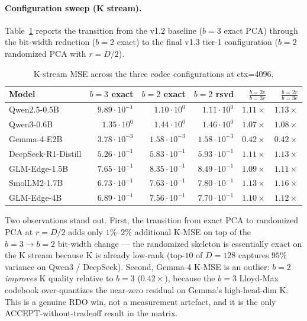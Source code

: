 \documentclass[11pt,a4paper]{article}
\theoremstyle{definition}
\theoremstyle{plain}
\begin{document}
\paragraph{Configuration sweep (K stream).}
Table~\ref{tab:mse-k-sweep} reports the transition from the v1.2 baseline ($b=3$ exact PCA) through the bit-width reduction ($b=2$ exact) to the final v1.3 tier-1 configuration ($b=2$ randomized PCA with $r=D/2$).

\begin{table}[H]
\centering
\small
\caption{K-stream MSE across the three codec configurations at ctx=4096.}
\label{tab:mse-k-sweep}
\begin{tabular}{lrrrrr}
  \toprule
  Model & $b=3$ exact & $b=2$ exact & $b=2$ rsvd & $\frac{b=2e}{b=3e}$ & $\frac{b=2r}{b=3e}$ \\
  \midrule
  Qwen2.5-0.5B                  & $9.89\!\cdot\!10^{-1}$ & $1.10\!\cdot\!10^{0}$  & $1.11\!\cdot\!10^{0}$  & $1.11\times$ & $1.13\times$ \\
  Qwen3-0.6B                    & $1.35\!\cdot\!10^{0}$  & $1.44\!\cdot\!10^{0}$  & $1.46\!\cdot\!10^{0}$  & $1.07\times$ & $1.08\times$ \\
  Gemma-4-E2B                   & $3.78\!\cdot\!10^{-3}$ & $1.58\!\cdot\!10^{-3}$ & $1.58\!\cdot\!10^{-3}$ & $0.42\times$ & $0.42\times$ \\
  DeepSeek-R1-Distill           & $5.26\!\cdot\!10^{-1}$ & $5.83\!\cdot\!10^{-1}$ & $5.93\!\cdot\!10^{-1}$ & $1.11\times$ & $1.13\times$ \\
  GLM-Edge-1.5B                 & $7.65\!\cdot\!10^{-1}$ & $8.35\!\cdot\!10^{-1}$ & $8.49\!\cdot\!10^{-1}$ & $1.09\times$ & $1.11\times$ \\
  SmolLM2-1.7B                  & $6.73\!\cdot\!10^{-1}$ & $7.63\!\cdot\!10^{-1}$ & $7.80\!\cdot\!10^{-1}$ & $1.13\times$ & $1.16\times$ \\
  GLM-Edge-4B                   & $6.89\!\cdot\!10^{-1}$ & $7.56\!\cdot\!10^{-1}$ & $7.70\!\cdot\!10^{-1}$ & $1.10\times$ & $1.12\times$ \\
  \bottomrule
\end{tabular}
\end{table}

Two observations stand out. First, the transition from exact PCA to randomized PCA at $r=D/2$ adds only $1\%$--$2\%$ additional K-MSE on top of the $b=3 \to b=2$ bit-width change --- the randomized skeleton is essentially exact on the K stream because K is already low-rank (top-$10$ of $D=128$ captures $95\%$ variance on Qwen3 / DeepSeek). Second, Gemma-4 K-MSE is an outlier: $b=2$ \emph{improves} K quality relative to $b=3$ ($0.42\times$), because the $b=3$ Lloyd-Max codebook over-quantizes the near-zero residual on Gemma's high-head-dim K. This is a genuine RDO win, not a measurement artefact, and it is the only ACCEPT-without-tradeoff result in the matrix.
\end{document}
